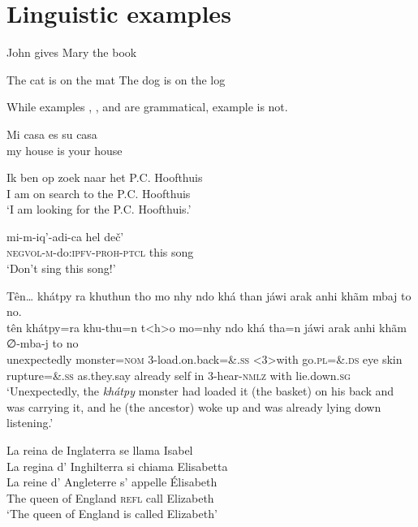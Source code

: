 \chapter{Linguistic examples} 

\ea\label{ex:john}
John gives Mary the book
\z

\ea\label{ex:cat}
  \ea The cat is on the mat
  \ex The dog is on the log
  \z
\z

\ea
  \z
\z

While examples , , and  are grammatical, example  is not.
 
\ea 
\gll Mi casa es su casa\\
     my house is your house\\
\z

\ea
\gll Ik ben op zoek naar het P.C. Hoofthuis\\
     I  am  on search to the P.C. Hoofthuis\\
\glt `I am looking for the P.C. Hoofthuis.'
\z

\ea
\gll mi-m-iq’-adi-ca            hel deč’\\
\textsc{negvol}-\textsc{m}-do:\textsc{ipfv}-\textsc{proh}-\textsc{ptcl} this  song  \\
\glt   ‘Don’t sing this song!’
\z

\ea
Tên{\dots} khátpy ra khuthun tho mo nhy ndo khá than jáwi arak anhi khãm mbaj to no.\\
\gll   tên           khátpy=ra   khu-thu=n  t<h>o   mo=nhy   ndo khá  tha=n              jáwi        arak    anhi khãm ∅-mba-j             to   no    \\
      unexpectedly monster=\textsc{nom} 3-load.on.back=\&.\textsc{ss} <3>with go.\textsc{pl}=\&.\textsc{ds} eye skin rupture=\&.\textsc{ss} as.they.say already self in   3-hear-\textsc{nmlz} with lie.down.\textsc{sg}\\
\glt ‘Unexpectedly, the \textit{khátpy} monster had loaded it (the basket) on his back and was carrying it, and he (the ancestor) woke up and was already lying down listening.’
\z

    
\ea
\gllll La reina de Inglaterra se llama Isabel      \\
       La regina d' Inghilterra si chiama Elisabetta\\
       La reine d' Angleterre s' appelle Élisabeth   \\
       The queen of England \textsc{refl} call Elizabeth    \\
\glt  ‘The queen of England is called Elizabeth'
\z

